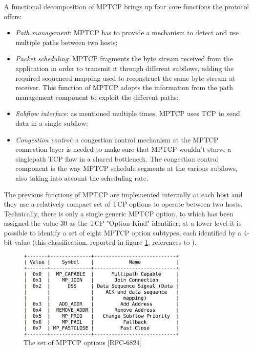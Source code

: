 A functional decomposition of MPTCP brings up four core functions the protocol offers:
\begin{itemize}
  \item \textit{Path management}: MPTCP has to provide a mechanism to detect and use multiple paths between two hosts;
  \item \textit{Packet scheduling}: MPTCP fragments the byte stream received from the application in order to transmit it through different subflows, adding the required sequenced mapping used to reconstruct the same byte stream at receiver. This function of MPTCP adopts the information from the path management component to exploit the different paths;
  \item \textit{Subflow interface}: as mentioned multiple times, MPTCP uses TCP to send data in a single subflow;
  \item \textit{Congestion control}: a congestion control mechanism at the MPTCP connection layer is needed to make sure that MPTCP wouldn't starve a singlepath TCP flow in a shared bottleneck. The congestion control component is the way MPTCP schedule segments at the various subflows, also taking into account the scheduling rate.
\end{itemize}

The previous functions of MPTCP are implemented internally at each host and they use a relatively compact set of TCP options to operate between two hosts. Technically, there is only a single generic MPTCP option, to which has been assigned the value 30 as the TCP "Option-Kind" identifier; at a lower level it is possible to identify a set of eight MPTCP option subtypes, each identified by a 4-bit value (this classification, reported in figure \ref{fig:MPTCP_options}, references to ). 

\begin{figure}[!htb]
\centering
\includegraphics[width=0.75\textwidth]{images/MPTCP_options}
\caption{The set of MPTCP options [RFC-6824]}
\label{fig:MPTCP_options}
\end{figure}

